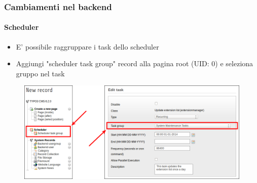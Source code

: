 \begin{frame}[fragile]
	\frametitle{Cambiamenti nel backend}
	\framesubtitle{Scheduler}

        \begin{itemize}
                \item E' possibile raggruppare i task dello scheduler
                \item Aggiungi "scheduler task group" record alla pagina root (UID: 0)\newline
                        e seleziona gruppo nel task
        \end{itemize}


	\begin{figure}
		\includegraphics[width=0.95\linewidth]{Images/BackendChanges/SchedulerTaskGroup.png}
	\end{figure}

\end{frame}


